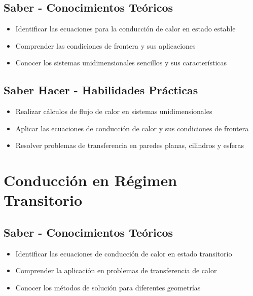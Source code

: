 \documentclass[12pt,a4paper,twoside]{book}
\begin{document}
	\subsection{Saber - Conocimientos Teóricos}
	\begin{saberbox}
		\begin{itemize}
			\item Identificar las ecuaciones para la conducción de calor en estado estable
			\item Comprender las condiciones de frontera y sus aplicaciones
			\item Conocer los sistemas unidimensionales sencillos y sus características
		\end{itemize}
	\end{saberbox}
	
	\subsection{Saber Hacer - Habilidades Prácticas}
	\begin{hacerbox}
		\begin{itemize}
			\item Realizar cálculos de flujo de calor en sistemas unidimensionales
			\item Aplicar las ecuaciones de conducción de calor y sus condiciones de frontera
			\item Resolver problemas de transferencia en paredes planas, cilindros y esferas
		\end{itemize}
	\end{hacerbox}
	
	\section{Conducción en Régimen Transitorio}
	\label{sec:conduccion_transitorio}
	
	\subsection{Saber - Conocimientos Teóricos}
	\begin{saberbox}
		\begin{itemize}
			\item Identificar las ecuaciones de conducción de calor en estado transitorio
			\item Comprender la aplicación en problemas de transferencia de calor
			\item Conocer los métodos de solución para diferentes geometrías
		\end{itemize}
	\end{saberbox}
	
\end{document}
